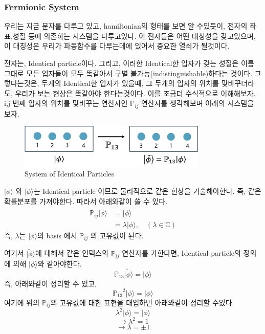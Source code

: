 \documentclass[11pt]{article}
\begin{document}
\subsubsection{Fermionic System}
우리는 지금 분자를 다루고 있고, hamiltonian의 형태를 보면 알 수있듯이, 전자의 좌표,성질 등에 의존하는 시스템을 다루고있다. 이 전자들은 어떤 대칭성을 갖고있으며, 이 대칭성은 우리가 파동함수를 다루는데에 있어서 중요한 열쇠가 될것이다. 

전자는, Identical particle이다. 그리고, 이러한 Identical한 입자가 갖는 성질은 이름 그대로 모든 입자들이 모두 똑같아서 구별 불가능(indistinguishable)하다는 것이다. 
그렇다는것은, 두개의 Identical한 입자가 있을때, 그 두개의 입자의 위치를 맞바꾸더라도, 우리가 보는 현상은 똑같아야 한다는것이다. 
이를 조금더 수식적으로 이해해보자. i,j 번째 입자의 위치를 맞바꾸는 연산자인 \(\mathbb{P}_{ij}\) 연산자를 생각해보며 아래의 시스템을 보자. 

\begin{figure}[htbp]
  \centering
  \includegraphics[width=0.8\textwidth]{fig/ident.png}
  \caption{System of Identical Particles}
  \label{fig:example2}
\end{figure}
\(\vert \tilde{\phi} \rangle\) 와 \(\vert \phi \rangle\)는 Identical particle 이므로 물리적으로 같은 현상을 기술해야한다. 즉, 같은 확률분포를 가져야한다. 따라서 아래와같이 쓸 수 있다. 
\begin{align*}
\mathbb{P}_{ij}\vert \phi \rangle &= \vert \tilde{\phi} \rangle \\
&= \lambda \vert \phi \rangle,\quad (\lambda \in \mathbb{C})
\end{align*}
즉, \(\lambda\)는 \(\vert \phi \rangle\)의 basis 에서 \(\mathbb{P}_{ij}\)  의 고유값이 된다. 

여기서 \(\vert \tilde{\phi} \rangle\)에 대해서 같은 인덱스의 \(\mathbb{P}_{ij}\) 연산자를 가한다면, Identical particle의 정의에 의해 \(\vert \phi \rangle\)와 같아야한다. 
\[
\mathbb{P}_{13} \vert \tilde{\phi} \rangle = \vert \phi \rangle
\]
즉, 아래와같이 정리할 수 있고, 
\[
{\mathbb{P}_{13}}^2 \vert \phi \rangle = \vert \phi \rangle
\]
여기에 위의 \(\mathbb{P}_{ij}\)의 고유값에 대한 표현을 대입하면 아래와같이 정리할 수있다. 
\[
{\lambda}^2 \vert \phi \rangle = \vert \phi \rangle
\]
\[
\longrightarrow {\lambda}^2 = 1
\]
\[
\longrightarrow \lambda = \pm 1
\]
\end{document}
